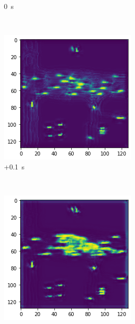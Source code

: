 \documentclass[12pt]{article}
\begin{document}
\begin{figure}[H]
\begin{subfigure}[b]{0.18\textwidth}
                \caption{0~s}
            \end{subfigure}
            ~
            \begin{subfigure}[b]{0.18\textwidth}
                \includegraphics[width=\textwidth]{output_opposite_3.png}
                \caption{+0.1~s}
            \end{subfigure}
            ~
            \begin{subfigure}[b]{0.18\textwidth}
                \includegraphics[width=\textwidth]{output_opposite_4.png}

\end{subfigure}
\end{figure}
\end{document}

